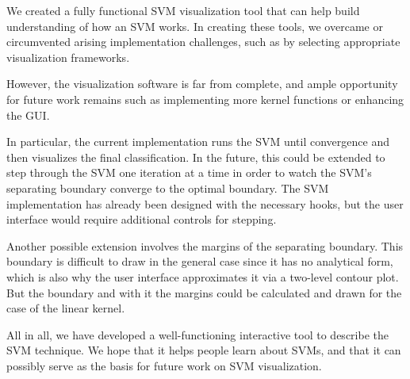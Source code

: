 \documentclass{scrartcl}
\begin{document}
We created a fully functional SVM visualization tool
that can help build understanding of how an SVM works.
In creating these tools, we overcame or circumvented arising implementation challenges,
such as by selecting appropriate visualization frameworks.

However, the visualization software is far from complete,
and ample opportunity for future work remains
such as implementing more kernel functions or enhancing the GUI.

In particular, the current implementation runs the SVM until convergence
and then visualizes the final classification.
In the future, this could be extended
to step through the SVM one iteration at a time
in order to watch the SVM's separating boundary converge to the optimal boundary.
The SVM implementation has already been designed with the necessary hooks,
but the user interface would require additional controls for stepping.

Another possible extension involves the margins of the separating boundary.
This boundary is difficult to draw in the general case since it has no analytical form,
which is also why the user interface approximates it via a two-level contour plot.
But the boundary and with it the margins could be calculated and drawn
for the case of the linear kernel.

All in all, we have developed a well-functioning interactive tool to describe the SVM technique.
We hope that it helps people learn about SVMs,
and that it can possibly serve as the basis for future work on SVM visualization.
\end{document}
